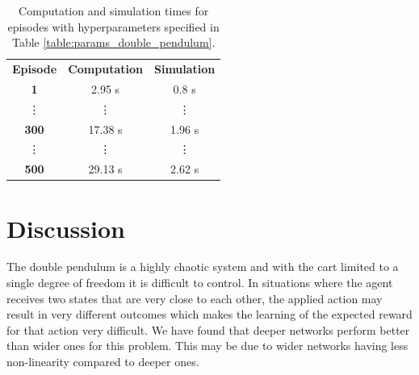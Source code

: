 \documentclass[final]{LTHtwocol} %
\begin{document}
\begin{table}[H]
	\centering
	\begin{tabular}{|c|c|c|}
	\hline
	\rowcolor[HTML]{CBCEFB} 
	\multicolumn{3}{|c|}{\cellcolor[HTML]{CBCEFB}\textbf{Double Pendulum}} \\ \hline
	\rowcolor[HTML]{FFCCC9} 
	\textbf{Episode} & \textbf{Computation} & \textbf{Simulation} \\ \hline
	\rowcolor[HTML]{FFFFC7} 
	\textbf{1} & 2.95 s & 0.8 s\\ \hline
	\rowcolor[HTML]{FFFFC7} 
	\vdots & \vdots & \vdots \\ \hline
	\rowcolor[HTML]{FFFFC7} 
	\textbf{300} & 17.38 s & 1.96 s \\ \hline
	\rowcolor[HTML]{FFFFC7} 
	\vdots & \vdots & \vdots \\ \hline
	\rowcolor[HTML]{FFFFC7} 
	\textbf{500} & 29.13 s & 2.62 s\\ \hline
	\end{tabular}
	\caption{Computation and simulation times for episodes with hyperparameters specified in Table \ref{table:params_double_pendulum}.}
	\label{table:def_params_time_double}
\end{table}

\section{Discussion}
The double pendulum is a highly chaotic system and with the cart limited to a single degree of freedom it is difficult to control.
In situations where the agent receives two states that are very close to each other, the applied action may result in very different outcomes which makes the learning of the expected reward for that action very difficult.
We have found that deeper networks perform better than wider ones for this problem.
This may be due to wider networks having less non-linearity compared to deeper ones.
\end{document}
